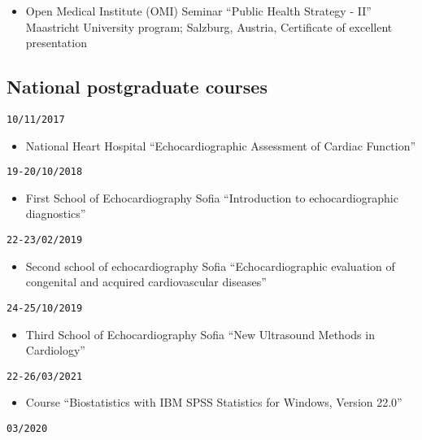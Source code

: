 \documentclass[
  12pt,
  letterpaper,
  DIV=11,
  numbers=noendperiod]{scrartcl}
\providecommand{\tightlist}{%
  \setlength{\itemsep}{0pt}\setlength{\parskip}{0pt}}\usepackage{longtable,booktabs,array}
\begin{document}
\begin{itemize}
\tightlist
\item
  Open Medical Institute (OMI) Seminar \textbar{} ``Public Health
  Strategy - II'' \textbar{} Maastricht University program; Salzburg,
  Austria, Certificate of excellent presentation
\end{itemize}

\subsection{National postgraduate
courses}\label{national-postgraduate-courses}

\texttt{10/11/2017}

\begin{itemize}
\tightlist
\item
  National Heart Hospital \textbar{} ``Echocardiographic Assessment of
  Cardiac Function''
\end{itemize}

\texttt{19-20/10/2018}

\begin{itemize}
\tightlist
\item
  First School of Echocardiography \textbar{} Sofia \textbar{}
  ``Introduction to echocardiographic diagnostics''
\end{itemize}

\texttt{22-23/02/2019}

\begin{itemize}
\tightlist
\item
  Second school of echocardiography \textbar{} Sofia \textbar{}
  ``Echocardiographic evaluation of congenital and acquired
  cardiovascular diseases''
\end{itemize}

\texttt{24-25/10/2019}

\begin{itemize}
\tightlist
\item
  Third School of Echocardiography \textbar{} Sofia \textbar{} ``New
  Ultrasound Methods in Cardiology''
\end{itemize}

\texttt{22-26/03/2021}

\begin{itemize}
\tightlist
\item
  Course ``Biostatistics with IBM SPSS Statistics for Windows, Version
  22.0''
\end{itemize}

\texttt{03/2020}
\end{document}
